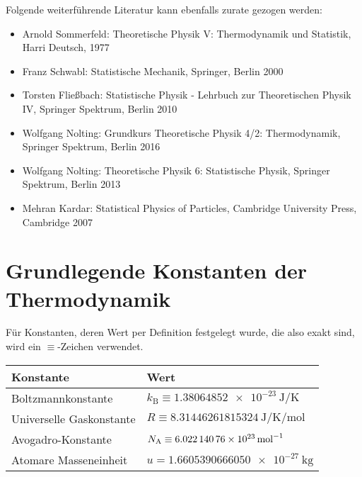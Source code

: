 Folgende weiterführende Literatur kann ebenfalls zurate gezogen werden:
\begin{itemize}
	\item Arnold Sommerfeld: Theoretische Physik V: Thermodynamik und Statistik, Harri Deutsch, 1977
	\item Franz Schwabl: Statistische Mechanik, Springer, Berlin 2000
	\item Torsten Fließbach: Statistische Physik - Lehrbuch zur Theoretischen Physik IV, Springer Spektrum, Berlin 2010
	\item Wolfgang Nolting: Grundkurs Theoretische Physik 4/2: Thermodynamik, Springer Spektrum, Berlin 2016
	\item Wolfgang Nolting: Theoretische Physik 6: Statistische Physik, Springer Spektrum, Berlin 2013
	\item Mehran Kardar: Statistical Physics of Particles, Cambridge University Press, Cambridge 2007
\end{itemize}



\section*{Grundlegende Konstanten der Thermodynamik}

Für Konstanten, deren Wert per Definition festgelegt wurde, die also exakt sind, wird ein $\equiv $-Zeichen verwendet.


\begin{table}[H]
	\centering
	\begin{tabular}{|l|l|} \hline
		\textbf{Konstante}       & \textbf{Wert}                                                                            \\
		\hline

		Boltzmannkonstante       & \centering\arraybackslash{} $k_\mathrm{B} \equiv \qty{1,38064852e-23}{\joule\per\kelvin}$ \\
		Universelle Gaskonstante & \centering\arraybackslash{} $R \equiv \qty{8,31446261815324}{\joule\per\kelvin\per\mole}$ \\
		Avogadro-Konstante        & \centering\arraybackslash{} $N_\mathrm{A} \equiv \qty{6,02214076e23}{\per\mole}$          \\
		Atomare Masseneinheit    & \centering\arraybackslash{} $u= \qty{1,6605390666050e-27}{\kg}$                           \\
		\hline
	\end{tabular}
\end{table}




